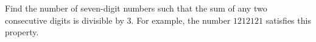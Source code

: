 Find the number of seven-digit numbers such that the sum of any two consecutive digits is divisible by $3$. For example, the number $1212121$ satisfies this property.
